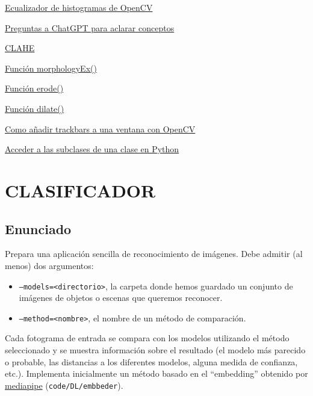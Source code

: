 \documentclass[12pt]{article}
\begin{document}
\href{https://docs.opencv.org/3.4/d4/d1b/tutorial_histogram_equalization.html}{Ecualizador de histogramas de OpenCV}

\href{https://chat.openai.com}{Preguntas a ChatGPT para aclarar conceptos}

\href{https://en.wikipedia.org/wiki/Adaptive_histogram_equalization}{CLAHE}

\href{https://docs.opencv.org/4.x/d4/d86/group__imgproc__filter.html#ga67493776e3ad1a3df63883829375201f}{Función morphologyEx()}

\href{https://docs.opencv.org/4.x/d4/d86/group__imgproc__filter.html#gaeb1e0c1033e3f6b891a25d0511362aeb}{Función erode()}

\href{https://docs.opencv.org/4.x/d4/d86/group__imgproc__filter.html#ga4ff0f3318642c4f469d0e11f242f3b6c}{Función dilate()}

\href{https://docs.opencv.org/3.4/da/d6a/tutorial_trackbar.html}{Como añadir trackbars a una ventana con OpenCV}

\href{https://stackoverflow.com/questions/3862310/how-to-find-all-the-subclasses-of-a-class-given-its-name}{Acceder a las subclases de una clase en Python}

\newpage
\section{CLASIFICADOR}
\subsection*{Enunciado}
Prepara una aplicación sencilla de reconocimiento de imágenes. Debe admitir (al menos) dos argumentos:

\begin{itemize}
    \item \texttt{--models=<directorio>}, la carpeta donde hemos guardado un conjunto de imágenes de objetos o escenas que queremos reconocer.

    \item \texttt{--method=<nombre>}, el nombre de un método de comparación.


\end{itemize}

Cada fotograma de entrada se compara con los modelos utilizando el método seleccionado y se muestra información sobre el resultado (el modelo más parecido o probable, las distancias a los diferentes modelos, alguna medida de confianza, etc.). Implementa inicialmente un método basado en el ``embedding'' obtenido por \href{https://developers.google.com/mediapipe/solutions/vision/image_embedder}{mediapipe} (\texttt{code/DL/embbeder}).
\end{document}
